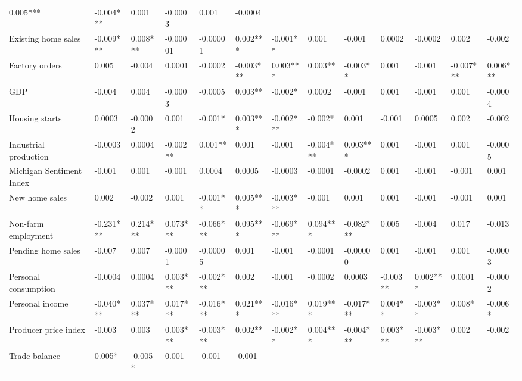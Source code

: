 \begin{landscape}
\begin{table}[]
{\begin{tabular}{lllllllllllll}
  0.005*** &
  -0.004*** &
  0.001 &
  -0.0003 &
  0.001 &
  -0.0004 \\
Existing home sales &
  -0.009*** &
  0.008*** &
  -0.00001 &
  -0.00001 &
  0.002*** &
  -0.001** &
  0.001 &
  -0.001 &
  0.0002 &
  -0.0002 &
  0.002 &
  -0.002 \\
Factory orders &
  0.005 &
  -0.004 &
  0.0001 &
  -0.0002 &
  -0.003*** &
  0.003*** &
  0.003** &
  -0.003** &
  0.001 &
  -0.001 &
  -0.007*** &
  0.006*** \\
GDP &
  -0.004 &
  0.004 &
  -0.0003 &
  -0.0005 &
  0.003** &
  -0.002* &
  0.0002 &
  -0.001 &
  0.001 &
  -0.001 &
  0.001 &
  -0.0004 \\
Housing starts &
  0.0003 &
  -0.0002 &
  0.001 &
  -0.001* &
  0.003*** &
  -0.002*** &
  -0.002* &
  0.001 &
  -0.001 &
  0.0005 &
  0.002 &
  -0.002 \\
Industrial production &
  -0.0003 &
  0.0004 &
  -0.002** &
  0.001** &
  0.001 &
  -0.001 &
  -0.004*** &
  0.003*** &
  0.001 &
  -0.001 &
  0.001 &
  -0.0005 \\
Michigan Sentiment Index &
  -0.001 &
  0.001 &
  -0.001 &
  0.0004 &
  0.0005 &
  -0.0003 &
  -0.0001 &
  -0.0002 &
  0.001 &
  -0.001 &
  -0.001 &
  0.001 \\
New home sales &
  0.002 &
  -0.002 &
  0.001 &
  -0.001** &
  0.005*** &
  -0.003*** &
  -0.001 &
  0.001 &
  0.001 &
  -0.001 &
  -0.001 &
  0.001 \\
Non-farm employment &
  -0.231*** &
  0.214*** &
  0.073*** &
  -0.066*** &
  0.095*** &
  -0.069*** &
  0.094*** &
  -0.082*** &
  0.005 &
  -0.004 &
  0.017 &
  -0.013 \\
Pending home sales &
  -0.007 &
  0.007 &
  -0.0001 &
  -0.00005 &
  0.001 &
  -0.001 &
  -0.0001 &
  -0.00000 &
  0.001 &
  -0.001 &
  0.001 &
  -0.0003 \\
Personal consumption &
  -0.0004 &
  0.0004 &
  0.003*** &
  -0.002*** &
  0.002 &
  -0.001 &
  -0.0002 &
  0.0003 &
  -0.003** &
  0.002*** &
  0.0001 &
  -0.0002 \\
Personal income &
  -0.040*** &
  0.037*** &
  0.017*** &
  -0.016*** &
  0.021*** &
  -0.016*** &
  0.019*** &
  -0.017*** &
  0.004** &
  -0.003** &
  0.008* &
  -0.006* \\
Producer price index &
  -0.003 &
  0.003 &
  0.003*** &
  -0.003*** &
  0.002** &
  -0.002** &
  0.004*** &
  -0.004*** &
  0.003*** &
  -0.003*** &
  0.002 &
  -0.002 \\
Trade balance &
  0.005* &
  -0.005* &
  0.001 &
  -0.001 &
  -0.001 &

\end{tabular}}
\end{table}
\end{landscape}

